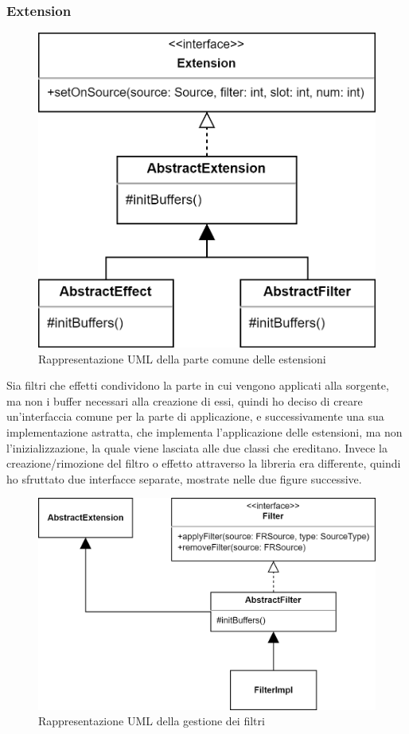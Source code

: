 \documentclass[a4paper,12pt]{report}
\begin{document}
\subsubsection*{Extension}
\begin{figure}[H]
\centering{}
\includegraphics[width=\textwidth]{img/extension/Extension.png}
\caption{Rappresentazione UML della parte comune delle estensioni}
\label{img:extension}
\end{figure}
Sia filtri che effetti condividono la parte in cui vengono applicati alla sorgente, ma non i buffer necessari alla creazione di essi, quindi ho deciso di creare un’interfaccia comune per la parte di applicazione, e successivamente una sua implementazione astratta, che implementa l’applicazione delle estensioni, ma non l’inizializzazione, la quale viene lasciata alle due classi che ereditano. Invece la creazione/rimozione del filtro o effetto attraverso la libreria era differente, quindi ho sfruttato due interfacce separate, mostrate nelle due figure successive.
%
\begin{figure}[H]
\centering{}
\includegraphics[width=\textwidth]{img/extension/Filter.png}
\caption{Rappresentazione UML della gestione dei filtri}
\label{img:filter}
\end{figure}
\end{document}
